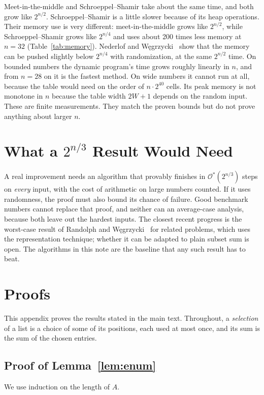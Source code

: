 \documentclass[conference]{IEEEtran}
\newcommand{\Oh}{\mathcal{O}}
\begin{document}
Meet-in-the-middle and Schroeppel--Shamir take about the same time, and both
grow like $2^{n/2}$. Schroeppel--Shamir is a little slower because of its heap
operations. Their memory use is very different: meet-in-the-middle grows like
$2^{n/2}$, while Schroeppel--Shamir grows like $2^{n/4}$ and uses about 200
times less memory at $n=32$ (Table~\ref{tab:memory}). Nederlof and
W\k{e}grzycki~\cite{nw} show that the memory can be pushed slightly below
$2^{n/4}$ with randomization, at the same $2^{n/2}$ time. On bounded numbers the
dynamic program's time grows roughly linearly in $n$, and from $n=28$ on it is
the fastest method. On wide numbers it cannot run at all, because the table
would need on the order of $n\cdot2^{40}$ cells. Its peak memory is not
monotone in $n$ because the table width $2W+1$ depends on the random input.
These are finite measurements. They match the proven bounds but do not prove
anything about larger $n$.

\section{What a $2^{n/3}$ Result Would Need}\label{sec:goal}
A real improvement needs an algorithm that provably finishes in
$\Oh^*(2^{n/3})$ steps on \emph{every} input, with the cost of arithmetic on
large numbers counted. If it uses randomness, the proof must also bound its
chance of failure. Good benchmark numbers cannot replace that proof, and
neither can an average-case analysis, because both leave out the hardest inputs.
The closest recent progress is the worst-case result of Randolph and
W\k{e}grzycki~\cite{rw} for related problems, which uses the representation
technique; whether it can be adapted to plain subset sum is open. The algorithms
in this note are the baseline that any such result has to beat.

\appendices
\section{Proofs}\label{app:proofs}
This appendix proves the results stated in the main text. Throughout, a
\emph{selection} of a list is a choice of some of its positions, each used at
most once, and its sum is the sum of the chosen entries.

\subsection{Proof of Lemma~\ref{lem:enum}}
We use induction on the length of $A$.
\end{document}

